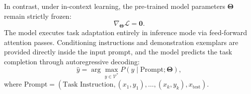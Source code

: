 \documentclass[../../main.tex]{subfiles}
\begin{document}
In contrast, under in-context learning, the pre-trained model parameters $\boldsymbol{\Theta}$ remain strictly frozen:
\begin{equation}
\nabla_{\boldsymbol{\Theta}} \mathcal{L} = \mathbf{0}.
\label{eq:frozen_parameters}
\end{equation}
The model executes task adaptation entirely in inference mode via feed-forward attention passes. Conditioning instructions and demonstration exemplars are provided directly inside the input prompt, and the model predicts the task completion through autoregressive decoding:
\begin{equation}
\hat{y} = \arg\max_{y \in \mathcal{V}^*} P(y \mid \text{Prompt}; \boldsymbol{\Theta}),
\label{eq:icl_generation}
\end{equation}
where $\text{Prompt} = (\text{Task Instruction}, (x_1, y_1), \dots, (x_k, y_k), x_{\text{test}})$.
\end{document}

